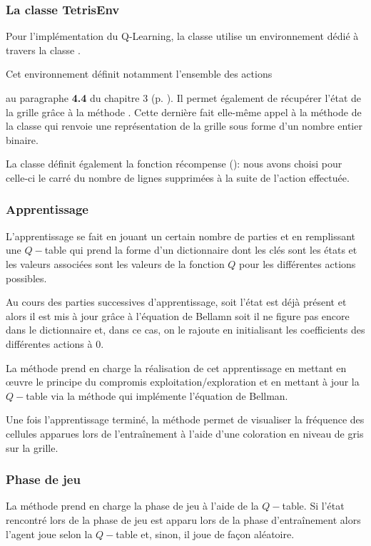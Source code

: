 \subsubsection{La classe TetrisEnv}

Pour l'implémentation du Q-Learning, la classe  utilise un environnement dédié à travers la classe .

Cet environnement définit notamment l'ensemble des actions
\begin{center}
\end{center}
au paragraphe \textbf{4.4} du chapitre 3 (p. \pageref{commande_de_jeu}). Il permet également de récupérer l'état de la grille grâce à la méthode . Cette dernière fait elle-même appel à la méthode  de la classe  qui renvoie une représentation de la grille sous forme d'un nombre entier binaire.

La classe  définit également la fonction récompense (): nous avons choisi pour celle-ci le carré du nombre de lignes supprimées à la suite de l'action effectuée.

\subsubsection{Apprentissage}
L'apprentissage se fait en jouant un certain nombre de parties et en remplissant une $Q-$table qui prend la forme d'un dictionnaire dont les clés sont les états et les valeurs associées sont les valeurs de la fonction $Q$ pour les différentes actions possibles.

Au cours des parties successives d'apprentissage, soit l'état est déjà présent et alors il est mis à jour grâce à l'équation de Bellamn soit il ne figure pas encore dans le dictionnaire et, dans ce cas, on le rajoute en initialisant les coefficients des différentes actions à $0$.

La méthode  prend en charge la réalisation de cet apprentissage en mettant en {\oe}uvre le principe du compromis exploitation/exploration et en mettant à jour la $Q-$table via la méthode  qui implémente l'équation de Bellman.

Une fois l'apprentissage terminé, la méthode  permet de visualiser la fréquence des cellules apparues lors de l'entraînement à l'aide d'une coloration en niveau de gris sur la grille.

\subsubsection{Phase de jeu}
La méthode  prend en charge la phase de jeu à l'aide de la $Q-$table. Si l'état rencontré lors de la phase de jeu est apparu lors de la phase d'entraînement alors l'agent joue selon la $Q-$table et, sinon, il joue de façon aléatoire. 






